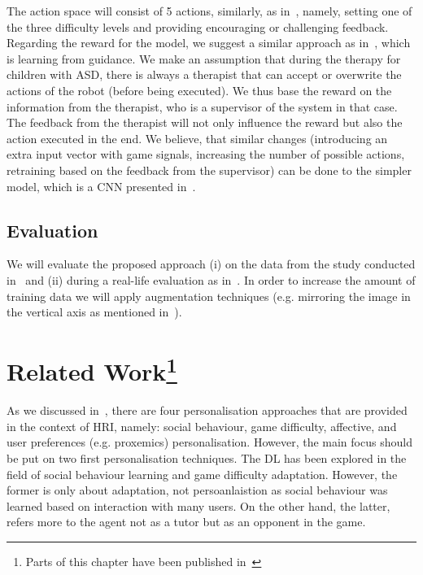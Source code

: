 \documentclass[thesis]{mas_proposal}
\begin{document}
The action space will consist of 5 actions, similarly, as in~\cite{tsiakas2018task,stolarz2022learningbased,stolarz2022personalisedrobot}, namely, setting one of the three difficulty levels and providing encouraging or challenging feedback. Regarding the reward for the model, we suggest a similar approach as in~\cite{senft2017supervised}, which is learning from guidance. We make an assumption that during the therapy for children with ASD, there is always a therapist that can accept or overwrite the actions of the robot (before being executed). We thus base the reward on the information from the therapist, who is a supervisor of the system in that case. The feedback from the therapist will not only influence the reward but also the action executed in the end. We believe, that similar changes (introducing an extra input vector with game signals, increasing the number of possible actions, retraining based on the feedback from the supervisor) can be done to the simpler model, which is a CNN presented in~\cite{Romeo2018,Romeo2019}.

\subsection{Evaluation}
We will evaluate the proposed approach (i) on the data from the study conducted in~\cite{stolarz2022learningbased,stolarz2022personalisedrobot} and (ii) during a real-life evaluation as in~\cite{Qureshi2016,romeo2021human}. In order to increase the amount of training data we will apply augmentation techniques (e.g. mirroring the image in the vertical axis as mentioned in~\cite{romeo2021human}).

\section[Related Work]{Related Work\footnote{Parts of this chapter have been published in~\cite{stolarz2022personalized}}}
\label{sec:related_work}

As we discussed in~\cite{stolarz2022personalized}, there are four personalisation approaches that are provided in the context of HRI, namely: social behaviour, game difficulty, affective, and user preferences (e.g. proxemics) personalisation. However, the main focus should be put on two first personalisation techniques. The DL has been explored in the field of social behaviour learning and game difficulty adaptation. However, the former is only about adaptation, not persoanlaistion as social behaviour was learned based on interaction with many users. On the other hand, the latter, refers more to the agent not as a tutor but as an opponent in the game.
\end{document}
